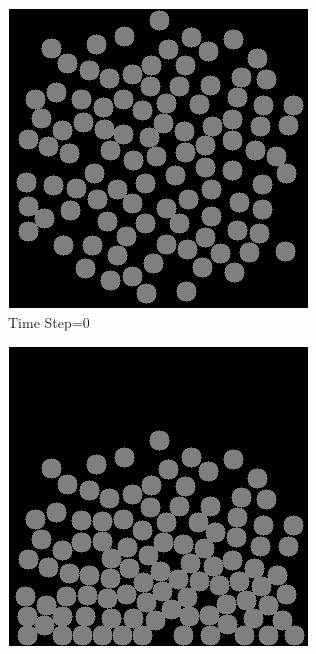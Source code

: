 \documentclass{beamer}
\begin{document}
\begin{frame}
\begin{figure}[!h]
        \centering
        \begin{subfigure}[b]{0.3\textwidth}
            \includegraphics[width=\textwidth]{../report/Figures/sim0.png}
            \caption{Time Step=$0$}
        \end{subfigure}
        \begin{subfigure}[b]{0.3\textwidth}
            \includegraphics[width=\textwidth]{../report/Figures/sim2.png}

\end{subfigure}
\end{figure}
\end{frame}
\end{document}
